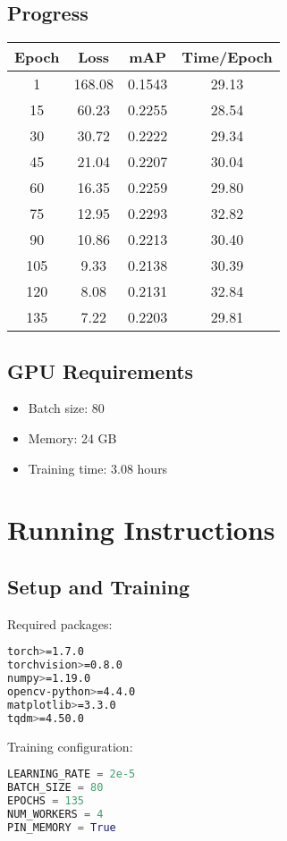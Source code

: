 \documentclass[conference]{IEEEtran}
\begin{document}
\subsection{Progress}
\begin{center}
\begin{tabular}{cccc}
\toprule
Epoch & Loss & mAP & Time/Epoch \\
\midrule
1 & 168.08 & 0.1543 & 29.13 \\
15 & 60.23 & 0.2255 & 28.54 \\
30 & 30.72 & 0.2222 & 29.34 \\
45 & 21.04 & 0.2207 & 30.04 \\
60 & 16.35 & 0.2259 & 29.80 \\
75 & 12.95 & 0.2293 & 32.82 \\
90 & 10.86 & 0.2213 & 30.40 \\
105 & 9.33 & 0.2138 & 30.39 \\
120 & 8.08 & 0.2131 & 32.84 \\
135 & 7.22 & 0.2203 & 29.81 \\
\bottomrule
\end{tabular}
\end{center}

\subsection{GPU Requirements}
\begin{itemize}
    \item Batch size: 80
    \item Memory: 24 GB
    \item Training time: 3.08 hours
\end{itemize}

\section{Running Instructions}

\subsection{Setup and Training}

\begin{center}
Required packages:
\begin{lstlisting}[language=bash]
torch>=1.7.0
torchvision>=0.8.0
numpy>=1.19.0
opencv-python>=4.4.0
matplotlib>=3.3.0
tqdm>=4.50.0
\end{lstlisting}

Training configuration:
\begin{lstlisting}[language=python]
LEARNING_RATE = 2e-5
BATCH_SIZE = 80
EPOCHS = 135
NUM_WORKERS = 4
PIN_MEMORY = True
\end{lstlisting}
\end{center}
\end{document}
